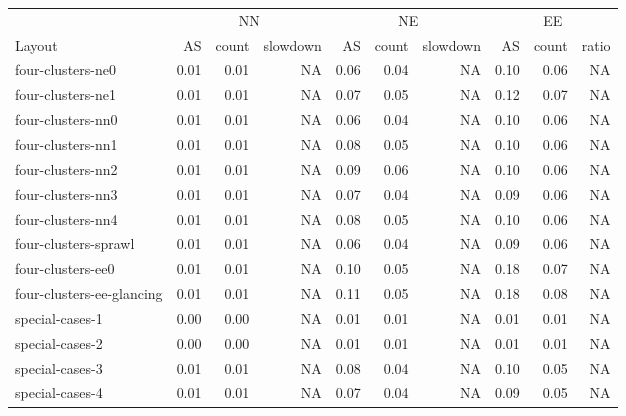\begin{tabular}{l|rrr|rrr|rrr}
\toprule
& \multicolumn{3}{c|}{NN} & \multicolumn{3}{c|}{NE} & \multicolumn{3}{c}{EE} \\
                         Layout &     AS & count & slowdown &     AS &  count & slowdown &       AS &   count & ratio \\
\midrule
              four-clusters-ne0 &   0.01 &  0.01 &       NA &   0.06 &   0.04 &       NA &     0.10 &    0.06 &    NA \\
              four-clusters-ne1 &   0.01 &  0.01 &       NA &   0.07 &   0.05 &       NA &     0.12 &    0.07 &    NA \\
              four-clusters-nn0 &   0.01 &  0.01 &       NA &   0.06 &   0.04 &       NA &     0.10 &    0.06 &    NA \\
              four-clusters-nn1 &   0.01 &  0.01 &       NA &   0.08 &   0.05 &       NA &     0.10 &    0.06 &    NA \\
              four-clusters-nn2 &   0.01 &  0.01 &       NA &   0.09 &   0.06 &       NA &     0.10 &    0.06 &    NA \\
              four-clusters-nn3 &   0.01 &  0.01 &       NA &   0.07 &   0.04 &       NA &     0.09 &    0.06 &    NA \\
              four-clusters-nn4 &   0.01 &  0.01 &       NA &   0.08 &   0.05 &       NA &     0.10 &    0.06 &    NA \\
           four-clusters-sprawl &   0.01 &  0.01 &       NA &   0.06 &   0.04 &       NA &     0.09 &    0.06 &    NA \\
              four-clusters-ee0 &   0.01 &  0.01 &       NA &   0.10 &   0.05 &       NA &     0.18 &    0.07 &    NA \\
      four-clusters-ee-glancing &   0.01 &  0.01 &       NA &   0.11 &   0.05 &       NA &     0.18 &    0.08 &    NA \\
                special-cases-1 &   0.00 &  0.00 &       NA &   0.01 &   0.01 &       NA &     0.01 &    0.01 &    NA \\
                special-cases-2 &   0.00 &  0.00 &       NA &   0.01 &   0.01 &       NA &     0.01 &    0.01 &    NA \\
                special-cases-3 &   0.01 &  0.01 &       NA &   0.08 &   0.04 &       NA &     0.10 &    0.05 &    NA \\
                special-cases-4 &   0.01 &  0.01 &       NA &   0.07 &   0.04 &       NA &     0.09 &    0.05 &    NA \\

\end{tabular}
